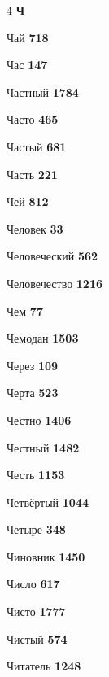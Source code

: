 \begin{multicols}{4}
\vspace{0.6em}\noindent\textbf{\normalsize\sffamily\color{primary} Ч}\par\vspace{0.2em}
\noindent Чай \dotfill \textbf{\color{secondary} 718}\par
\noindent Час \dotfill \textbf{\color{secondary} 147}\par
\noindent Частный \dotfill \textbf{\color{secondary} 1784}\par
\noindent Часто \dotfill \textbf{\color{secondary} 465}\par
\noindent Частый \dotfill \textbf{\color{secondary} 681}\par
\noindent Часть \dotfill \textbf{\color{secondary} 221}\par
\noindent Чей \dotfill \textbf{\color{secondary} 812}\par
\noindent Человек \dotfill \textbf{\color{secondary} 33}\par
\noindent Человеческий \dotfill \textbf{\color{secondary} 562}\par
\noindent Человечество \dotfill \textbf{\color{secondary} 1216}\par
\noindent Чем \dotfill \textbf{\color{secondary} 77}\par
\noindent Чемодан \dotfill \textbf{\color{secondary} 1503}\par
\noindent Через \dotfill \textbf{\color{secondary} 109}\par
\noindent Черта \dotfill \textbf{\color{secondary} 523}\par
\noindent Честно \dotfill \textbf{\color{secondary} 1406}\par
\noindent Честный \dotfill \textbf{\color{secondary} 1482}\par
\noindent Честь \dotfill \textbf{\color{secondary} 1153}\par
\noindent Четвёртый \dotfill \textbf{\color{secondary} 1044}\par
\noindent Четыре \dotfill \textbf{\color{secondary} 348}\par
\noindent Чиновник \dotfill \textbf{\color{secondary} 1450}\par
\noindent Число \dotfill \textbf{\color{secondary} 617}\par
\noindent Чисто \dotfill \textbf{\color{secondary} 1777}\par
\noindent Чистый \dotfill \textbf{\color{secondary} 574}\par
\noindent Читатель \dotfill \textbf{\color{secondary} 1248}\par

\end{multicols}
